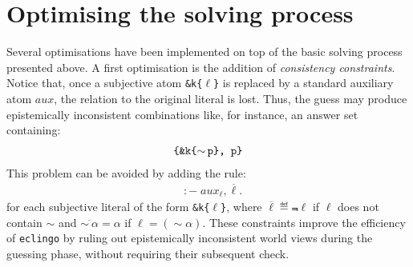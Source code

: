 \documentclass{new_tlp}
\def\eclingo{{\tt eclingo}}
\def\clingo{{\tt clingo}}
\begin{document}
\section{Optimising the solving process}
\label{sec:optim}
Several optimisations have been implemented on top of the basic solving process presented above.
%
A first optimisation is the addition of \emph{consistency constraints}.
%
Notice that, once a subjective atom {\tt \&k\{$\ell$\}} is replaced by a standard auxiliary atom $\mathit{aux}$, the relation to the original literal is lost.
%
Thus, the guess may produce epistemically inconsistent combinations like, for instance, an answer set containing:
\begin{align*}
	\texttt{\{\&k\{$\sim$\,p\}, p\}}
\end{align*}
This problem can be avoided by adding the rule:
\begin{align*}
&\mathtt{:-} \; \mathit{aux}_\ell, \overline{\ell}.
\end{align*}
%
for each subjective literal of the form {\tt \&k\{$\ell$\}}, where $\overline{\ell} \eqdef \Not \ell$ if $\ell$ does not contain $\sim$ and $\overline{\sim\ \alpha}=\alpha$ if $\ell = (\sim \alpha)$.
%
These constraints improve the efficiency of \eclingo{} by ruling out epistemically inconsistent world views during the guessing phase, without requiring their subsequent check.
\end{document}
